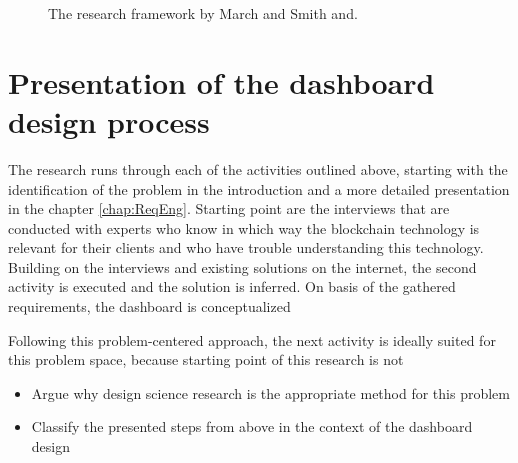 \begin{figure}
    \centering
    
    \caption[The research framework by March and Smith.]{The research framework by March and Smith and.\footnotemark}
    \label{fig:researchFR}
\end{figure}



\section{Presentation of the dashboard design process}

The research runs through each of the activities outlined above, starting with the identification of the problem in the introduction and a more detailed presentation in the chapter \ref{chap:ReqEng}. Starting point are the interviews that are conducted with experts who know in which way the blockchain technology is relevant for their clients and who have trouble understanding this technology. Building on the interviews and existing solutions on the internet, the second activity is executed and the solution is inferred. On basis of the gathered requirements, the dashboard is conceptualized

Following this problem-centered approach, the next activity is ideally suited for this problem space, because starting point of this research is not 

\begin{itemize}
    \item Argue why design science research is the appropriate method for this problem
    \item Classify the presented steps from above in the context of the dashboard design
\end{itemize}